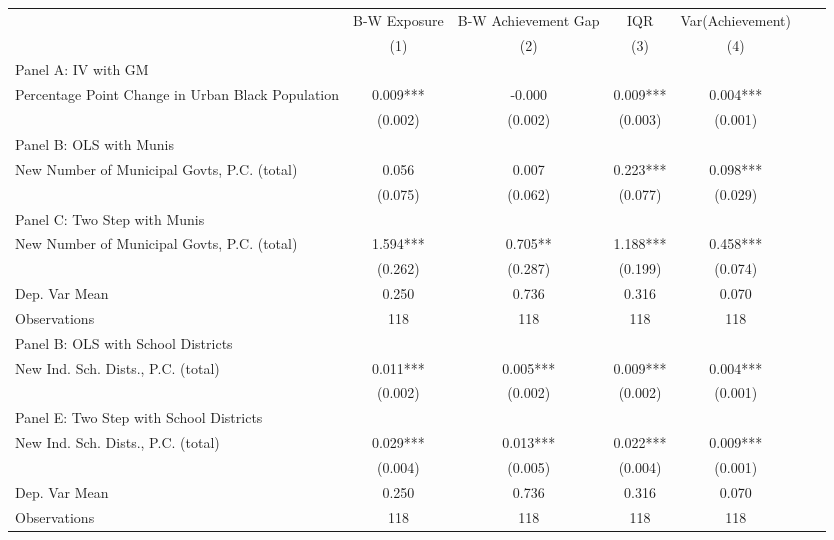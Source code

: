  \begin{tabular}{l*{6}{c}} \toprule
&\multicolumn{1}{c}{B-W Exposure}&\multicolumn{1}{c}{B-W Achievement Gap}&\multicolumn{1}{c}{IQR}&\multicolumn{1}{c}{Var(Achievement)}&\\\cmidrule(lr){2-2}\cmidrule(lr){3-3}\cmidrule(lr){4-4}\cmidrule(lr){5-5}
&\multicolumn{1}{c}{(1)}&\multicolumn{1}{c}{(2)}&\multicolumn{1}{c}{(3)}&\multicolumn{1}{c}{(4)}\\
\cmidrule(lr){1-5}
\multicolumn{4}{l}{Panel A: IV with GM}\\
\cmidrule(lr){1-5}
Percentage Point Change in Urban Black Population&    0.009***&   -0.000   &    0.009***&    0.004***\\
                &  (0.002)   &  (0.002)   &  (0.003)   &  (0.001)   \\
\cmidrule(lr){1-5}
\multicolumn{4}{l}{Panel B: OLS with Munis}\\
\cmidrule(lr){1-5}
New Number of Municipal Govts, P.C. (total)&    0.056   &    0.007   &    0.223***&    0.098***\\
                &  (0.075)   &  (0.062)   &  (0.077)   &  (0.029)   \\
\cmidrule(lr){1-5}
\multicolumn{4}{l}{Panel C: Two Step with Munis}\\
\cmidrule(lr){1-5}
New Number of Municipal Govts, P.C. (total)&    1.594***&    0.705** &    1.188***&    0.458***\\
                &  (0.262)   &  (0.287)   &  (0.199)   &  (0.074)   \\
\midrule
Dep. Var Mean   &    0.250   &    0.736   &    0.316   &    0.070   \\
Observations    &      118   &      118   &      118   &      118   \\
\cmidrule(lr){1-5}
\multicolumn{4}{l}{Panel B: OLS with School Districts}\\
\cmidrule(lr){1-5}
New Ind. Sch. Dists., P.C. (total)&    0.011***&    0.005***&    0.009***&    0.004***\\
                &  (0.002)   &  (0.002)   &  (0.002)   &  (0.001)   \\
\cmidrule(lr){1-5}
\multicolumn{4}{l}{Panel E: Two Step with School Districts}\\
\cmidrule(lr){1-5}
New Ind. Sch. Dists., P.C. (total)&    0.029***&    0.013***&    0.022***&    0.009***\\
                &  (0.004)   &  (0.005)   &  (0.004)   &  (0.001)   \\
\midrule
Dep. Var Mean   &    0.250   &    0.736   &    0.316   &    0.070   \\
Observations    &      118   &      118   &      118   &      118   \\
       \bottomrule \end{tabular}
